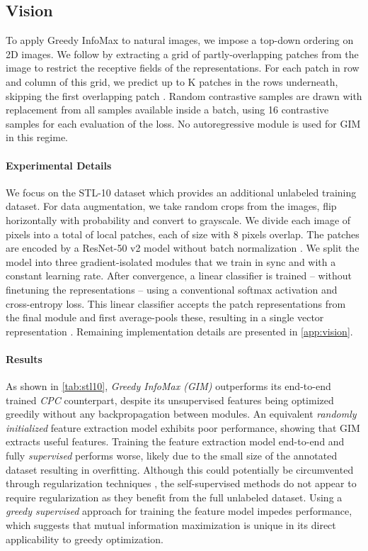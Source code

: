 \documentclass{article}
\begin{document}
\subsection{Vision} \label{sec:vision}
To apply Greedy InfoMax to natural images, we impose a top-down ordering on 2D images. We follow \citet{oord2018representation,Henaff2019-nb} by extracting a grid of partly-overlapping patches from the image to restrict the receptive fields of the representations. For each patch  in row  and column  of this grid, we predict up to K patches  in the rows underneath, skipping the first overlapping patch . Random contrastive samples are drawn with replacement from all samples available inside a batch, using 16 contrastive samples for each evaluation of the loss. No autoregressive module  is used for GIM in this regime.

\paragraph{Experimental Details} We focus on the STL-10 dataset \citep{coates2011analysis} which provides an additional unlabeled training dataset. For data augmentation, we take random  crops from the  images, flip horizontally with probability  and convert to grayscale. We divide each image of  pixels into a total of  local patches, each of size  with 8 pixels overlap. The patches are encoded by a ResNet-50 v2 model \citep{he2016identity} without batch normalization \citep{ioffe2015batch}. We split the model into three gradient-isolated modules that we train in sync and with a constant learning rate. After convergence, a linear classifier is trained -- without finetuning the representations -- using a conventional softmax activation and cross-entropy loss. This linear classifier accepts the patch representations  from the final module and first  average-pools these, resulting in a single vector representation .  Remaining implementation details are presented in \cref{app:vision}.


\paragraph{Results} As shown in \cref{tab:stl10}, \textit{Greedy InfoMax (GIM)} outperforms its end-to-end trained \textit{CPC} counterpart, despite its unsupervised features being optimized greedily without any backpropagation between modules. An equivalent \textit{randomly initialized} feature extraction model exhibits poor performance, showing that GIM extracts useful features. Training the feature extraction model end-to-end and fully \textit{supervised} performs worse, likely due to the small size of the annotated dataset resulting in overfitting. Although this could potentially be circumvented through regularization techniques \citep{devries2017improved}, the self-supervised methods do not appear to require regularization as they benefit from the full unlabeled dataset. Using a \textit{greedy supervised} approach for training the feature model impedes performance, which suggests that mutual information maximization is unique in its direct applicability to greedy optimization.
\end{document}
